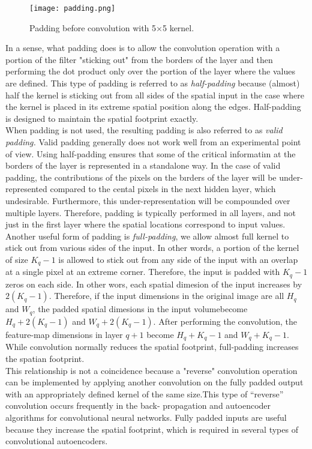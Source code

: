 \documentclass[11pt]{article}
\begin{document}
\begin{figure}[H]
\centering
\texttt{[image: padding.png]}
\caption{Padding before convolution with 5$\times$5 kernel.}
\label{fig:figure3}
\end{figure}

In a sense, what padding does is to allow the convolution operation with a portion of the filter "sticking out" from the borders of the layer and then performing the dot product only over the portion of the layer where the values are defined. This type of padding is referred to as \textit{half-padding} because (almost) half the kernel is sticking out from all sides of the spatial input in the case where the kernel is placed in its extreme spatial position along the edges. Half-padding is designed to maintain the spatial footprint exactly.\\
\hspace*{1cm} When padding is not used, the resulting padding is also referred to as \textit{valid padding.} Valid padding generally does not work well from an experimental point of view. Using half-padding ensures that some of the critical informatiın at the borders of the layer is represented in a standalone way. In the case of valid padding, the contributions of the pixels on the bırders of the layer will be under-represented compared to the cental pixels in the next hidden layer, which undesirable. Furthermore, this under-representation will be compounded over multiple layers. Therefore, padding is typically performed in all layers, and not just in the first layer where the spatial locations correspond to input values. \\
\hspace*{1cm} Another useful form of padding is \textit{full-padding}, we allow almost full kernel to stick out from various sides of the input. In other words, a portion of the kernel of size $K_q-1$ is allowed to stick out from any side of the input with an overlap at a single pixel at an extreme corner. Therefore, the input is padded with $K_q-1$ zeros on each side. In other wors, each spatial dimesion of the input increases by $2(K_q-1)$. Therefore, if the input dimensions in the original image are all $H_q$ and $W_q$, the padded spatial dimesions in the input volumebecome $H_q+2(K_q-1)$ and $W_q+2(K_q-1)$. After performing the convolution, the feature-map dimensions in layer $q+1$ become $H_q+K_q-1$ and $W_q+K_q-1$. While convolution normally reduces the spatial footprint, full-padding increases the spatian footprint.\\
This relationship is not a coincidence because a "reverse" convolution operation can be implemented by applying another convolution on the fully padded output with an appropriately defined kernel of the same size.This type of “reverse” convolution occurs frequently in the back- propagation and autoencoder algorithms for convolutional neural networks. Fully padded inputs are useful because they increase the spatial footprint, which is required in several types of convolutional autoencoders.
\end{document}
